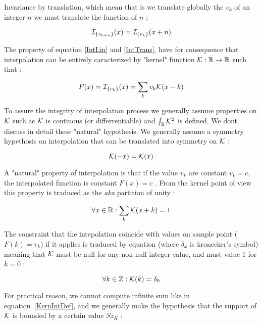 Invariance by translation, which mean that is we translate globally the $v_k$ of an integer $n$
we must translate the function of $n$ :

\begin{equation}
    \mathcal I_{\{v_{k+n}\}}(x) =  \mathcal I_{\{v_{k}\}}(x+n)  \label{IntTrans}
\end{equation}

The property of equation \ref{IntLin} and \ref{IntTrans}, have for consequence that interpolation
can be entirely caracterized by "kernel" function $\mathcal K : \mathbb{R} \rightarrow \mathbb{R} $ such that :

\begin{equation}
    F(x) =  \mathcal I_{\{v_{k}\}}(x) = \sum_{k}  v_k  \mathcal K(x-k)   \label{KernIntDef}
\end{equation}

To assure the  integrity of interpolation process we generally assume properties on $\mathcal K$
such as $\mathcal K$ is continous (or differrentiable) and  $\int_{\mathbb{R}} \mathcal K ^2 $ is defined. We dont
discuss in detail these "natural" hypothesis.
We generally assume a symmetry hypethosis on interpolation that can be translated into symmetry on
$\mathcal K$ :

\begin{equation}
    \mathcal K(-x) =   \mathcal K(x)   \label{KernIntSym}
\end{equation}


A "natural" property of interpolation is that if the value $v_k$ are constant $v_k=c$, the interpolated function 
is constant $F(x)=c$ . From the kernel point of view this property is traduced as the \emph{aka} partition of unity :

\begin{equation}
    \forall x \in \mathbb{R} : \sum_k \mathcal K(x+k) =   1 \label{PartUnit}
\end{equation}


The constraint that the intepolation coincide with values on sample point ($F(k)=v_k$) if it
applies  is traduced by equation (where $\delta_x$ is kronecker's symbol) meaning that $ \mathcal K$ must
be null for any non null integer value, and must value $1$ for $k=0$ :

\begin{equation}
    \forall k \in \mathbb{Z} :  \mathcal K(k) =   \delta_0 \label{KernIntDelta0}
\end{equation}

For practical reason, we cannot compute infinite sum like in equation~\ref{KernIntDef}, and we 
generally make the hypothesis that the support of $\mathcal K$ is bounded by a certain value $Sz_K$ :


